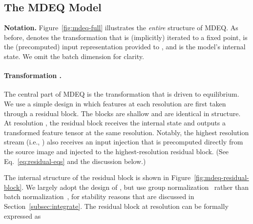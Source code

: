 \documentclass{article}
\begin{document}
\subsection{The MDEQ Model}
\label{subsec:mdeq}

\textbf{Notation.} Figure~\ref{fig:mdeq-full} illustrates the \emph{entire} structure of MDEQ. As before,  denotes the transformation that is (implicitly) iterated to a fixed point,  is the (precomputed) input representation provided to , and  is the model's internal state. We omit the batch dimension for clarity.

\vspace{-.1in}
\paragraph{Transformation .} The central part of MDEQ is the transformation  that is driven to equilibrium. We use a simple design in which features at each resolution are first taken through a residual block. The blocks are shallow and are identical in structure. At resolution , the residual block receives the internal state  and outputs a transformed feature tensor  at the same resolution.
Notably, the highest resolution stream (i.e., ) also receives an input injection  that is precomputed directly from the source image and injected to the highest-resolution residual block. (See Eq.~\eqref{eq:residual-eqs} and the discussion below.)

The internal structure of the residual block is shown in Figure~\ref{fig:mdeq-residual-block}. We largely adopt the design of \citet{he2016deep}, but use group normalization~\cite{wu2018group} rather than batch normalization~\cite{ioffe2015batch}, for stability reasons that are discussed in Section~\ref{subsec:integrate}.
The residual block at resolution  can be formally expressed as

\vspace{-.15in}

\vspace{-.12in}
\end{document}
